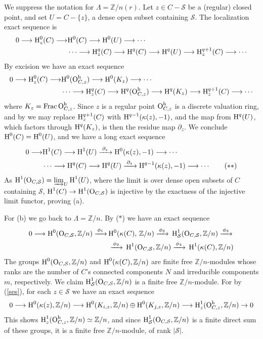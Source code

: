 \documentclass{amsart}
\theoremstyle{plain}
\theoremstyle{definition}
\theoremstyle{remark}
\numberwithin{equation}{section}%
\newcommand{\h}{{\text{\rm h}}}
\renewcommand{\H}{{\text{\rm H}}}
\renewcommand{\O}{{\text{\rm O}}}
\renewcommand{\S}{{\mathcal S}}
\newcommand{\Z}{{\mathbb Z}}
\newcommand{\isom}{{\;\simeq\;}}
\newcommand{\Frac}{{\text{\rm Frac}\,}}
\newcommand{\Pf}{{\noindent{\it Proof.}\;\;}}
\newcommand{\Spec}{{\text{\rm Spec}\,}}
\begin{document}
\Pf
We suppress the notation for $\Lambda=\Z/n(r)$.
Let $z\in C-\S$ be a (regular) closed point, and set $U=C-\{z\}$, 
a dense open subset containing $\S$.  
The localization exact sequence is
\begin{align*}
0\longrightarrow\H^0_z(C)\longrightarrow&\H^0(C)\longrightarrow\H^0(U)
\longrightarrow\cdots\\
&\cdots\longrightarrow\H^q_z(C)\longrightarrow\H^q(C)\longrightarrow\H^q(U)\longrightarrow\H^{q+1}_z(C)\longrightarrow\cdots
\end{align*}
By excision we have an exact sequence
\begin{align*}
0\longrightarrow\H^0_z(C)\longrightarrow&\H^0(\O_{C,z}^\h)
\longrightarrow\H^0(K_z)\longrightarrow\cdots\\
&\cdots\longrightarrow\H^q_z(C)
\longrightarrow\H^q(\O_{C,z}^\h)\longrightarrow\H^q(K_z)
\longrightarrow\H^{q+1}_z(C)\longrightarrow\cdots
\end{align*}
where $K_z=\Frac\O_{C,z}^\h$.
Since $z$ is a regular point $\O_{C,z}^\h$ is a discrete valuation ring,
and by \cite[Section 3.6]{CT95}
we may replace $\H^{q+1}_z(C)$ with $\H^{q-1}(\kappa(z),-1)$,
and the map from $\H^q(U)$, which factors
through $\H^q(K_z)$, is then the residue map $\partial_z$.
We conclude 
$\H^0(C)=\H^0(U)$, and we have a long exact sequence
\begin{align*}
0\longrightarrow&\H^1(C)\longrightarrow\H^1(U)\xrightarrow{\;\partial_z\;}
\H^0(\kappa(z),-1)\longrightarrow \cdots\\
&\cdots\longrightarrow\H^q(C)\longrightarrow\H^q(U)
\xrightarrow{\;\partial_z\;}\H^{q-1}(\kappa(z),-1)\longrightarrow\cdots
\tag{$**$}
\end{align*}
As $\H^1(\O_{C,\S})=\varinjlim_U\H^1(U)$,
where the limit is over dense open subsets of $C$ containing $\S$,
$\H^1(C)\to\H^1(\O_{C,\S})$ is injective by
the exactness of the injective limit functor, proving (a).

For (b) we go back to $\Lambda=\Z/n$.    
By ($*$) we have an exact sequence
\begin{align*}
0\longrightarrow\H^0(\O_{C,\S},\Z/n)\xrightarrow{\,\phi_1\,}\,
&\H^0(\kappa(C),\,\Z/n)\xrightarrow{\,\phi_2\,}\,\H^1_\S(\O_{C,\S}, \Z/n)\xrightarrow{\,\phi_3\,}\,\\
&\xrightarrow{\,\phi_3\,}\,\H^1(\O_{C,\S},\Z/n)\xrightarrow{\,\phi_4\,}\,\H^1(\kappa(C),\Z/n)
\end{align*}
The groups $\H^0(\O_{C,\S},\Z/n)$ and $\H^0(\kappa(C),\Z/n)$
are finite free $\Z/n$-modules whose ranks are the number of $C$'s connected components $N$
and irreducible components $m$, respectively.
We claim $\H^1_\S(\O_{C,\S},\Z/n)$ is a finite free $\Z/n$-module.
For by (\ref{ses}), for each $z\in\S$ we have an exact sequence
$$
0\longrightarrow\H^0(\kappa(z),\Z/n)\longrightarrow\H^0(K_{i,z},\Z/n)\oplus\H^0(K_{j,z},\Z/n)\longrightarrow\H^1_z(\O_{C,z}^\h,\Z/n)\to 0
$$
This shows $\H^1_z(\O_{C,z}^\h,\Z/n)\isom\Z/n$,
and since $\H^1_\S(\O_{C,\S},\Z/n)$ is a finite direct sum of these groups,
it is a finite free $\Z/n$-module, of rank $|\S|$.
\end{document}
